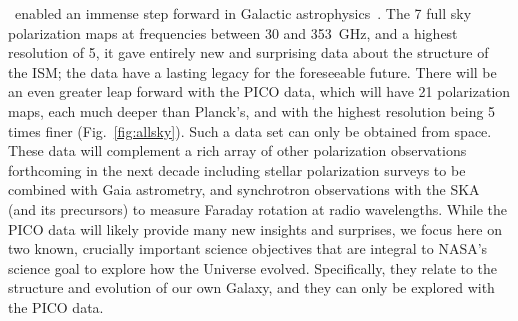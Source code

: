 \documentclass[PICOReport.tex]{subfiles}
\begin{document}
\planck\ enabled an immense step forward in Galactic astrophysics~\citep{Planck2018:XII}. The 7  full sky polarization maps at frequencies between 30  and 353~GHz, and a highest resolution of 5\arcmin, it gave entirely new and surprising data about the structure of the ISM; the data have a lasting legacy for the foreseeable future. There will be an even greater leap forward with the PICO data, which will have 21 polarization maps, each much deeper than Planck's, and with the highest resolution being 5 times finer (Fig.~\ref{fig:allsky}). Such a data set can only be obtained from space. These data will complement a rich array of other polarization observations forthcoming in the next decade including stellar polarization surveys to be combined with Gaia astrometry, and synchrotron observations with the SKA (and its precursors) to measure Faraday rotation at radio wavelengths. While the PICO data will likely provide many new insights and surprises, we focus here on two known, crucially important science objectives that are integral to NASA's science goal to explore how the Universe evolved. Specifically, they relate to the structure and evolution of our own Galaxy, and they can only be explored with the PICO data.\\
%
\end{document}
